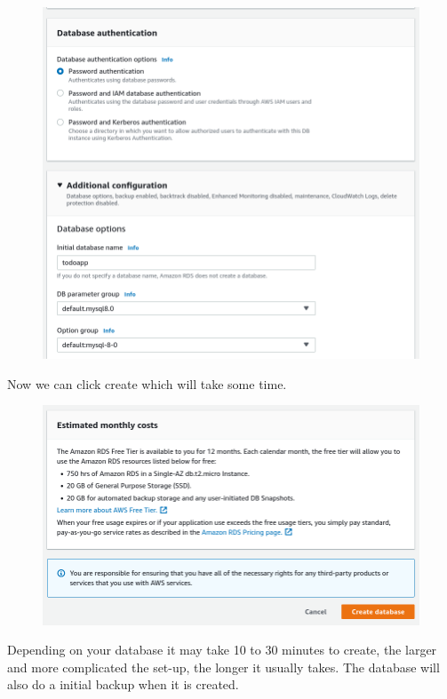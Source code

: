 \documentclass{csse4400}
\begin{document}
\begin{figure}[H]
  \includegraphics[width=\textwidth]{images/db7}
\end{figure}

Now we can click create which will take some time.

\begin{figure}[H]
  \includegraphics[width=\textwidth]{images/db8}
\end{figure}

Depending on your database it may take 10 to 30 minutes to create, the larger and more complicated the set-up, the longer it usually takes. The database will also do a initial backup when it is created.
\end{document}
